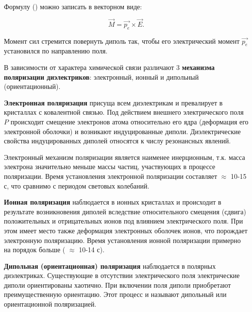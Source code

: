 \documentclass[__main__.tex]{subfiles}
\begin{document}
Формулу () можно записать в векторном виде:

\begin{equation}
\vec{M} = \vec{p_e} \times \vec{E}.
\end{equation}

Момент сил стремится повернуть диполь так, чтобы его электрический момент $\vec{p_e}$ установился по направлению поля.

В зависимости от характера химической связи различают 3 \textbf{механизма поляризации диэлектриков}: электронный, ионный и дипольный (ориентационный).

\textbf{Электронная поляризация} присуща всем диэлектрикам и превалирует в кристаллах с ковалентной связью. Под действием внешнего электрического поля $P$ происходит смещение электронов атома относительно его ядра (деформация его электронной оболочки) и возникают индуцированные диполи. Диэлектрические свойства индуцированных диполей относятся к числу резонансных явлений.

Электронный механизм поляризации является наименее инерционным, т.к. масса электрона значительно меньше массы частиц, участвующих в процессе поляризации. Время установления электронной поляризации составляет $\approx$ 10-15 с, что сравнимо с периодом световых колебаний.

\textbf{Ионная поляризация} наблюдается в ионных кристаллах и происходит в результате возникновения диполей вследствие относительного смещения (сдвига) положительных и отрицательных ионов под влиянием электрического поля. При этом имеет место также деформация электронных оболочек ионов, что порождает электронную поляризацию. Время установления ионной поляризации примерно на порядок больше ( $\approx$ 10-14 с).

\textbf{Дипольная (ориентационная) поляризация} наблюдается в полярных диэлектриках. Существующие в отсутствии электрического поля электрические диполи ориентированы хаотично. При включении поля диполи приобретают преимущественную ориентацию. Этот процесс и называют дипольный или ориентационной поляризацией.
\end{document}
